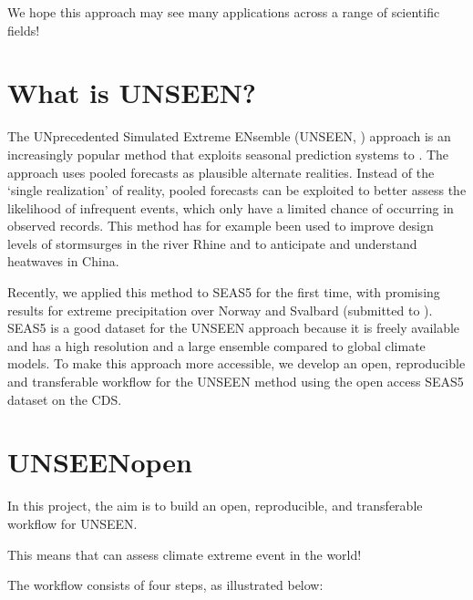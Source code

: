 \documentclass[letterpaper,10pt,english]{sphinxmanual}
\let\sphinxpxdimen\pdfpxdimen\else\newdimen\sphinxpxdimen
\begin{document}
We hope this approach may see many applications across a range of scientific fields!


\section{What is UNSEEN?}
\label{\detokenize{Whats-unseen:What-is-UNSEEN?}}\label{\detokenize{Whats-unseen::doc}}
The UNprecedented Simulated Extreme ENsemble (UNSEEN, ) approach is an increasingly popular method that exploits seasonal prediction systems to . The approach uses pooled forecasts as plausible alternate realities. Instead of the ‘single realization’ of reality, pooled forecasts can be exploited to better assess the likelihood of infrequent events,
which only have a limited chance of occurring in observed records. This method has for example been used to improve design levels of storm\sphinxhyphen{}surges in the river Rhine and to anticipate and understand heatwaves in China.

Recently, we applied this method to SEAS5 for the first time, with promising results for extreme precipitation over Norway and Svalbard (submitted to ). SEAS5 is a good dataset for the UNSEEN approach because it is freely available and has a high resolution and a large ensemble compared to global climate models. To make this approach more accessible, we develop an open, reproducible and transferable workflow for the
UNSEEN method using the open access SEAS5 dataset on the CDS.


\section{UNSEEN\sphinxhyphen{}open}
\label{\detokenize{Notebooks/Workflow:UNSEEN-open}}\label{\detokenize{Notebooks/Workflow::doc}}
In this project, the aim is to build an open, reproducible, and transferable workflow for UNSEEN.

This means that  can assess  climate extreme event  in the world!

The workflow consists of four steps, as illustrated below:

\sphinxincludegraphics[width=935\sphinxpxdimen,height=645\sphinxpxdimen]{{Workflow}.png}
\end{document}
